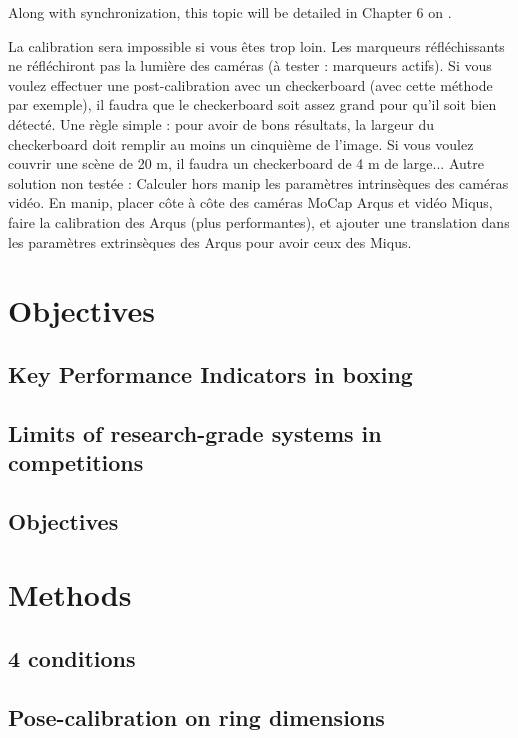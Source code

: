 Along with synchronization, this topic will be detailed in Chapter 6 on .

La calibration sera impossible si vous êtes trop loin. Les marqueurs réfléchissants ne réfléchiront pas la lumière des caméras (à tester : marqueurs actifs).  
Si vous voulez effectuer une post-calibration avec un checkerboard (avec cette méthode par exemple), il faudra que le checkerboard soit assez grand pour qu’il soit bien détecté. Une règle simple : pour avoir de bons résultats, la largeur du checkerboard doit remplir au moins un cinquième de l’image. Si vous voulez couvrir une scène de 20 m, il faudra un checkerboard de 4 m de large...  
Autre solution non testée : Calculer hors manip les paramètres intrinsèques des caméras vidéo. En manip, placer côte à côte des caméras MoCap Arqus et vidéo Miqus, faire la calibration des Arqus (plus performantes), et ajouter une translation dans les paramètres extrinsèques des Arqus pour avoir ceux des Miqus. 


\section{Objectives}
\subsection{Key Performance Indicators in boxing}
\blindtext

\subsection{Limits of research-grade systems in competitions}
\blindtext

\subsection{Objectives}
\blindtext


\section{Methods}
\subsection{4 conditions}
\blindtext

\subsection{Pose-calibration on ring dimensions}
\blindtext

